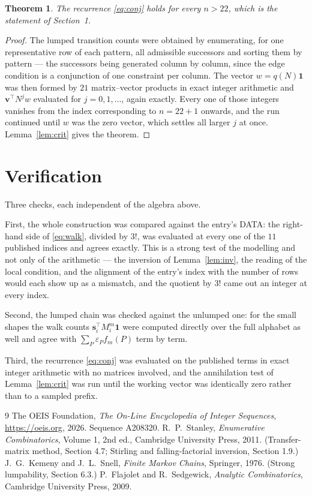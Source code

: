 \documentclass[11pt,a4paper]{article}
\theoremstyle{plain}
\newtheorem{theorem}{Theorem}
\theoremstyle{definition}
\begin{document}
\begin{theorem}
The recurrence \eqref{eq:conj} holds for every $n>22$, which is the statement of
Section~1.
\end{theorem}

\begin{proof}
The lumped transition counts were obtained by enumerating, for one representative row of
each pattern, all admissible successors and sorting them by pattern --- the successors being
generated column by column, since the edge condition is a conjunction of one constraint per
column. The vector $w=q(N)\mathbf{1}$ was then formed by $21$ matrix--vector products
in exact integer arithmetic and $\mathbf{v}^{\!\top}N^{j}w$ evaluated for
$j=0,1,\dots$, again exactly. Every one of those integers vanishes from the index
corresponding to $n=22+1$ onwards, and the run continued until $w$ was the zero vector,
which settles all larger $j$ at once. Lemma~\ref{lem:crit} gives the theorem.
\end{proof}

\section{Verification}

Three checks, each independent of the algebra above.

First, the whole construction was compared against the entry's DATA: the right-hand side of
\eqref{eq:walk}, divided by $3!$, was evaluated at every one of the $11$
published indices and agrees exactly. This is a strong test of the modelling and not only of
the arithmetic --- the inversion of Lemma~\ref{lem:inv}, the reading of the local
condition, and the alignment of the entry's index with the number of rows would each
show up as a mismatch, and the quotient by $3!$ came out an integer at every index.

Second, the lumped chain was checked against the unlumped one: for the small shapes the walk
counts $\mathbf{s}_i^{\!\top}M_i^{m}\mathbf{1}$ were computed directly over the full
alphabet as well and agree with $\sum_P\varepsilon_Pf_m(P)$ term by term.

Third, the recurrence \eqref{eq:conj} was evaluated on the published terms in exact integer
arithmetic with no matrices involved, and the annihilation test of Lemma~\ref{lem:crit} was
run until the working vector was identically zero rather than to a sampled prefix.

\begin{thebibliography}{9}
 The OEIS Foundation, \emph{The On-Line Encyclopedia of Integer
Sequences}, \url{https://oeis.org}, 2026. Sequence A208320.
 R.~P.~Stanley, \emph{Enumerative Combinatorics}, Volume 1, 2nd ed.,
Cambridge University Press, 2011. (Transfer-matrix method, Section 4.7; Stirling and
falling-factorial inversion, Section 1.9.)
 J.~G.~Kemeny and J.~L.~Snell, \emph{Finite Markov Chains}, Springer,
1976. (Strong lumpability, Section 6.3.)
 P.~Flajolet and R.~Sedgewick, \emph{Analytic Combinatorics}, Cambridge
University Press, 2009.
\end{thebibliography}
\end{document}
